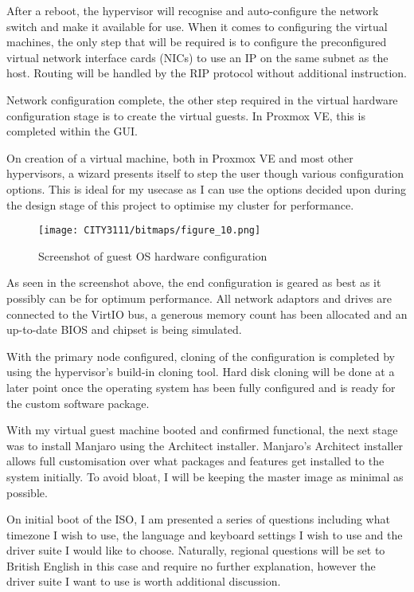 After a reboot, the hypervisor will recognise and auto-configure the network switch and make it available for use. When it comes to configuring the virtual machines, the only step that will be required is to configure the preconfigured virtual network interface cards (NICs) to use an IP on the same subnet as the host. Routing will be handled by the RIP protocol without additional instruction.

Network configuration complete, the other step required in the virtual hardware configuration stage is to create the virtual guests. In Proxmox VE, this is completed within the GUI.

On creation of a virtual machine, both in Proxmox VE and most other hypervisors, a wizard presents itself to step the user though various configuration options. This is ideal for my usecase as I can use the options decided upon during the design stage of this project to optimise my cluster for performance.

\begin{figure}[H]
    \texttt{[image: CITY3111/bitmaps/figure\_10.png]}
    \caption{Screenshot of guest OS hardware configuration}
    \label{figure_10}
\end{figure}

As seen in the screenshot above, the end configuration is geared as best as it possibly can be for optimum performance. All network adaptors and drives are connected to the VirtIO bus, a generous memory count has been allocated and an up-to-date BIOS and chipset is being simulated.

With the primary node configured, cloning of the configuration is completed by using the hypervisor's build-in cloning tool. Hard disk cloning will be done at a later point once the operating system has been fully configured and is ready for the custom software package.

\textbf{}

With my virtual guest machine booted and confirmed functional, the next stage was to install Manjaro using the Architect installer. Manjaro's Architect installer allows full customisation over what packages and features get installed to the system initially. To avoid bloat, I will be keeping the master image as minimal as possible.

On initial boot of the ISO, I am presented a series of questions including what timezone I wish to use, the language and keyboard settings I wish to use and the driver suite I would like to choose. Naturally, regional questions will be set to British English in this case and require no further explanation, however the driver suite I want to use is worth additional discussion.

